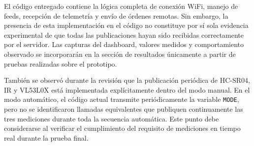 El código entregado contiene la lógica completa de conexión WiFi, manejo de feeds, recepción de telemetría y envío de órdenes remotas. Sin embargo, la presencia de esta implementación en el código no constituye por sí sola evidencia experimental de que todas las publicaciones hayan sido recibidas correctamente por el servidor. Las capturas del dashboard, valores medidos y comportamiento observado se incorporarán en la sección de resultados únicamente a partir de pruebas realizadas sobre el prototipo.

También se observó durante la revisión que la publicación periódica de HC-SR04, IR y VL53L0X está implementada explícitamente dentro del modo manual. En el modo automático, el código actual transmite periódicamente la variable \texttt{MODE}, pero no se identificaron llamadas equivalentes que publiquen continuamente las tres mediciones durante toda la secuencia automática. Este punto debe considerarse al verificar el cumplimiento del requisito de mediciones en tiempo real durante la prueba final.

